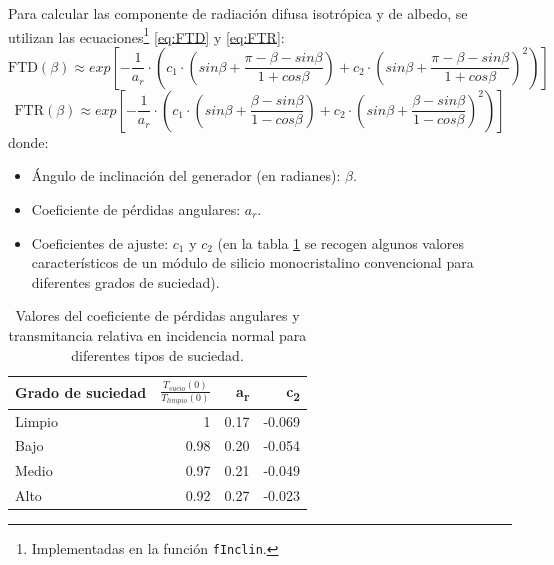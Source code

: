 Para calcular las componente de radiación difusa isotrópica y de albedo, se utilizan las ecuaciones\footnote{Implementadas en la función \texttt{fInclin}.} \ref{eq:FTD} y \ref{eq:FTR}:
\begin{equation}
\text{FTD}(\beta) \approx exp[-\frac{1}{a_r}\cdot (c_1\cdot (sin\beta +\frac{\pi -\beta - sin\beta}{1+cos\beta})+c_2\cdot (sin\beta +\frac{\pi -\beta -sin\beta}{1+cos\beta})^2)]
\label{eq:FTD}
\end{equation}
\begin{equation}
\text{FTR}(\beta) \approx exp[-\frac{1}{a_r}\cdot (c_1\cdot (sin\beta +\frac{\beta - sin\beta}{1-cos\beta})+c_2\cdot (sin\beta +\frac{\beta -sin\beta}{1-cos\beta})^2)]
\end{equation}
\label{eq:FTR}
donde:
\begin{itemize}
\item Ángulo de inclinación del generador (en radianes): \(\beta\). 
\item Coeficiente de pérdidas angulares: \(a_r\).
\item Coeficientes de ajuste: \(c_1\) y \(c_2\) (en la tabla \ref{tab:coef-perd} se recogen algunos valores característicos de un módulo de silicio monocristalino convencional para diferentes grados de suciedad).
\end{itemize}
\begin{table}[htbp]
\caption{Valores del coeficiente de pérdidas angulares y transmitancia relativa en incidencia normal para diferentes tipos de suciedad. \label{tab:coef-perd}}
\centering
\begin{tabular}{lrrr}
\hline
Grado de suciedad & \(\frac{T_{sucio}(0)}{T_{limpio}(0)}\) & a\textsubscript{r} & c\textsubscript{2}\\[0pt]
\hline
Limpio & 1 & 0.17 & -0.069\\[0pt]
\hline
Bajo & 0.98 & 0.20 & -0.054\\[0pt]
\hline
Medio & 0.97 & 0.21 & -0.049\\[0pt]
\hline
Alto & 0.92 & 0.27 & -0.023\\[0pt]
\hline
\end{tabular}
\end{table}

